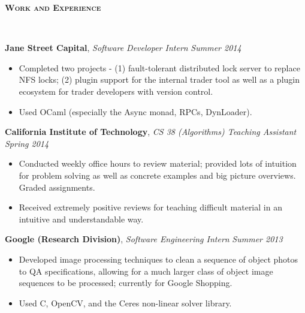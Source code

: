\documentclass{article}
\newenvironment{changemargin}[2]{%
  \begin{list}{}{%
    \setlength{\topsep}{0pt}%
    \setlength{\leftmargin}{#1}%
    \setlength{\rightmargin}{#2}%
    \setlength{\listparindent}{\parindent}%
    \setlength{\itemindent}{\parindent}%
    \setlength{\parsep}{\parskip}%
  }%
  \item[]}{\end{list}
}
\newcommand{\lineover}{
	\begin{changemargin}{-0.05in}{-0.05in}
		\vspace*{-8pt}
		\hrulefill \\
		\vspace*{-2pt}
	\end{changemargin}
}
\newcommand{\header}[1]{
	\begin{changemargin}{-0.5in}{-0.5in}
		{\large \textbf{\scshape{#1}}}\\
  	\lineover
	\end{changemargin}
}
\newenvironment{body} {
	\vspace*{-16pt}
	\begin{changemargin}{-0.25in}{-0.5in}
  }	
	{\end{changemargin}
}
\newcommand{\CC}{C\nolinebreak\hspace{-.05em}\raisebox{.4ex}{\tiny\bf +}\nolinebreak\hspace{-.10em}\raisebox{.4ex}{\tiny\bf +}}
\begin{document}
\smallskip


\header{Work and Experience}

\begin{body}
	\vspace{14pt}
	\textbf{Jane Street Capital}, \emph{Software Developer Intern} \hfill \emph{Summer 2014}\\
	\vspace*{-4pt}
	\begin{itemize}
		\item Completed two projects - (1) fault-tolerant distributed lock server to replace NFS locks; (2) plugin support for the internal trader tool as well as a plugin ecosystem for trader developers with version control.
		\item Used OCaml (especially the Async monad, RPCs, DynLoader).
	\end{itemize}

	\medskip

	\textbf{California Institute of Technology}, \emph{CS 38 (Algorithms) Teaching Assistant} \hfill \emph{Spring 2014}\\
	\vspace*{-4pt}
	\begin{itemize}
		\item Conducted weekly office hours to review material; provided lots of intuition for problem solving as well as concrete examples and big picture overviews. Graded assignments. 
		\item Received extremely positive reviews for teaching difficult material in an intuitive and understandable way.
	\end{itemize}

	\medskip

	\textbf{Google (Research Division)}, \emph{Software Engineering Intern} \hfill \emph{Summer 2013}\\
	\vspace*{-4pt}
	\begin{itemize}
		\item Developed image processing techniques to clean a sequence of object photos to QA specifications, allowing for a much larger class of object image sequences to be processed; currently for Google Shopping.
		\item Used \CC, OpenCV, and the Ceres non-linear solver library.
	\end{itemize}

	\medskip


\end{body}
\end{document}
